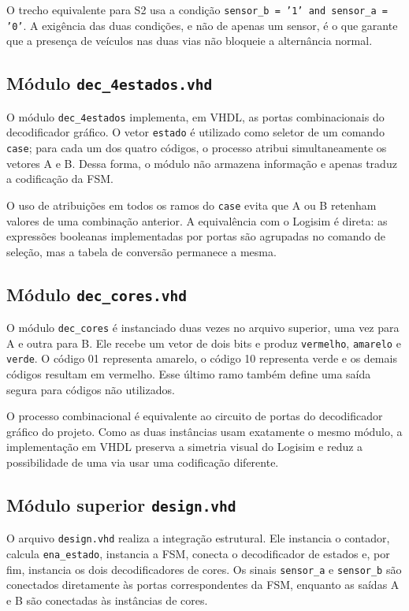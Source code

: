 \documentclass[conference]{IEEEtran}
\begin{document}
O trecho equivalente para S2 usa a condição
\texttt{sensor\_b = '1' and sensor\_a = '0'}. A exigência das duas
condições, e não de apenas um sensor, é o que garante que a presença de
veículos nas duas vias não bloqueie a alternância normal.

\subsection{Módulo \texttt{dec\_4estados.vhd}}

O módulo \texttt{dec\_4estados} implementa, em VHDL, as portas
combinacionais do decodificador gráfico. O vetor \texttt{estado} é utilizado
como seletor de um comando \texttt{case}; para cada um dos quatro códigos,
o processo atribui simultaneamente os vetores A e B. Dessa forma, o módulo
não armazena informação e apenas traduz a codificação da FSM.

O uso de atribuições em todos os ramos do \texttt{case} evita que A ou B
retenham valores de uma combinação anterior. A equivalência com o Logisim
é direta: as expressões booleanas implementadas por portas são agrupadas no
comando de seleção, mas a tabela de conversão permanece a mesma.

\subsection{Módulo \texttt{dec\_cores.vhd}}

O módulo \texttt{dec\_cores} é instanciado duas vezes no arquivo superior,
uma vez para A e outra para B. Ele recebe um vetor de dois bits e produz
\texttt{vermelho}, \texttt{amarelo} e \texttt{verde}. O código 01 representa
amarelo, o código 10 representa verde e os demais códigos resultam em
vermelho. Esse último ramo também define uma saída segura para códigos não
utilizados.

O processo combinacional é equivalente ao circuito de portas do decodificador
gráfico do projeto. Como as duas instâncias usam exatamente o
mesmo módulo, a implementação em VHDL preserva a simetria visual do
Logisim e reduz a possibilidade de uma via usar uma codificação diferente.

\subsection{Módulo superior \texttt{design.vhd}}

O arquivo \texttt{design.vhd} realiza a integração estrutural. Ele instancia
o contador, calcula \texttt{ena\_estado}, instancia a FSM, conecta o
decodificador de estados e, por fim, instancia os dois decodificadores de
cores. Os sinais \texttt{sensor\_a} e \texttt{sensor\_b} são conectados
diretamente às portas correspondentes da FSM, enquanto as saídas A e B são
conectadas às instâncias de cores.
\end{document}
